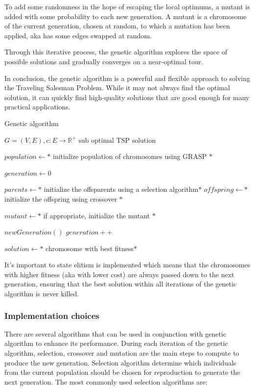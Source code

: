 To add some randomness in the hope of escaping the local optimums, a mutant is added with some probability to each new generation. A mutant is a chromosome of the current generation, chosen at random, to which a mutation has been applied, aka has some edges swapped at random.

Through this iterative process, the genetic algorithm explores the space of possible solutions and gradually converges on a near-optimal tour.

In conclusion, the genetic algorithm is a powerful and flexible approach to solving the Traveling Salesman Problem. While it may not always find the optimal solution, it can quickly find high-quality solutions that are good enough for many practical applications.

\begin{algorithm}
    \caption{Genetic algorithm}\label{algo:genetic}
    \begin{algorithmic}[1]
    \Require $G = (V,E), c:E \to \mathbb{R}^+$
    \Ensure $\text{sub optimal TSP solution}$
    
    \State $population \gets *$ initialize population of chromosomes using GRASP $*$

    \State $ generation \gets 0$


        \State $parents \gets *$ initialize the offsparents  using a selection algorithm$*$
        \State $offspring \gets *$ initialize the offspring using crossover $*$

        \State $mutant \gets *$ if appropriate, initialize the mutant $*$

        \State $ newGeneration() $
        \State $ generation++ $

    \EndWhile

    \State $ solution \gets *$ chromosome with best fitness$*$

    

    \end{algorithmic}
\end{algorithm}

It's important to state elitism is implemented which means that the chromosomes with higher fitness (aka with lower cost) are always passed down to the next generation, ensuring that the best solution within all iterations of the genetic algorithm is never killed. 

\subsubsection{Implementation choices}
There are several algorithms that can be used in conjunction with genetic algorithm to enhance its performance.
During each iteration of the genetic algorithm, selection, crossover and mutation are the main steps to compute to produce the new generation.
Selection algorithm determine which individuals from the current population should be chosen for reproduction to generate the next generation. The most commonly used selection algorithms are:

